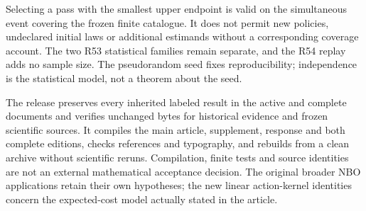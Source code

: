 Selecting a pass with the smallest upper endpoint is valid on the simultaneous event covering the frozen finite catalogue. It does not permit new policies, undeclared initial laws or additional estimands without a corresponding coverage account. The two R53 statistical families remain separate, and the R54 replay adds no sample size. The pseudorandom seed fixes reproducibility; independence is the statistical model, not a theorem about the seed.

The release preserves every inherited labeled result in the active and complete documents and verifies unchanged bytes for historical evidence and frozen scientific sources. It compiles the main article, supplement, response and both complete editions, checks references and typography, and rebuilds from a clean archive without scientific reruns. Compilation, finite tests and source identities are not an external mathematical acceptance decision. The original broader NBO applications retain their own hypotheses; the new linear action-kernel identities concern the expected-cost model actually stated in the article.
